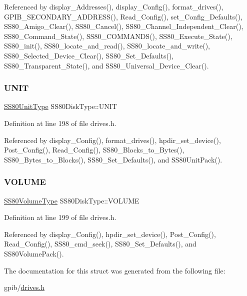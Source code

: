 Referenced by display\+\_\+\+Addresses(), display\+\_\+\+Config(), format\+\_\+drives(), G\+P\+I\+B\+\_\+\+S\+E\+C\+O\+N\+D\+A\+R\+Y\+\_\+\+A\+D\+D\+R\+E\+S\+S(), Read\+\_\+\+Config(), set\+\_\+\+Config\+\_\+\+Defaults(), S\+S80\+\_\+\+Amigo\+\_\+\+Clear(), S\+S80\+\_\+\+Cancel(), S\+S80\+\_\+\+Channel\+\_\+\+Independent\+\_\+\+Clear(), S\+S80\+\_\+\+Command\+\_\+\+State(), S\+S80\+\_\+\+C\+O\+M\+M\+A\+N\+D\+S(), S\+S80\+\_\+\+Execute\+\_\+\+State(), S\+S80\+\_\+init(), S\+S80\+\_\+locate\+\_\+and\+\_\+read(), S\+S80\+\_\+locate\+\_\+and\+\_\+write(), S\+S80\+\_\+\+Selected\+\_\+\+Device\+\_\+\+Clear(), S\+S80\+\_\+\+Set\+\_\+\+Defaults(), S\+S80\+\_\+\+Transparent\+\_\+\+State(), and S\+S80\+\_\+\+Universal\+\_\+\+Device\+\_\+\+Clear().

\mbox{\label{structSS80DiskType_ac630da1440afd60d726c7c41eb7b990c}} 
\subsubsection{\texorpdfstring{U\+N\+IT}{UNIT}}
{\footnotesize\ttfamily \hyperlink{structSS80UnitType}{S\+S80\+Unit\+Type} S\+S80\+Disk\+Type\+::\+U\+N\+IT}



Definition at line 198 of file drives.\+h.



Referenced by display\+\_\+\+Config(), format\+\_\+drives(), hpdir\+\_\+set\+\_\+device(), Post\+\_\+\+Config(), Read\+\_\+\+Config(), S\+S80\+\_\+\+Blocks\+\_\+to\+\_\+\+Bytes(), S\+S80\+\_\+\+Bytes\+\_\+to\+\_\+\+Blocks(), S\+S80\+\_\+\+Set\+\_\+\+Defaults(), and S\+S80\+Unit\+Pack().

\mbox{\label{structSS80DiskType_adef69576dbc48a5d70ff628578d77b60}} 
\subsubsection{\texorpdfstring{V\+O\+L\+U\+ME}{VOLUME}}
{\footnotesize\ttfamily \hyperlink{structSS80VolumeType}{S\+S80\+Volume\+Type} S\+S80\+Disk\+Type\+::\+V\+O\+L\+U\+ME}



Definition at line 199 of file drives.\+h.



Referenced by display\+\_\+\+Config(), hpdir\+\_\+set\+\_\+device(), Post\+\_\+\+Config(), Read\+\_\+\+Config(), S\+S80\+\_\+cmd\+\_\+seek(), S\+S80\+\_\+\+Set\+\_\+\+Defaults(), and S\+S80\+Volume\+Pack().



The documentation for this struct was generated from the following file\+:\begin{DoxyCompactItemize}
\item 
gpib/\hyperlink{drives_8h}{drives.\+h}\end{DoxyCompactItemize}
